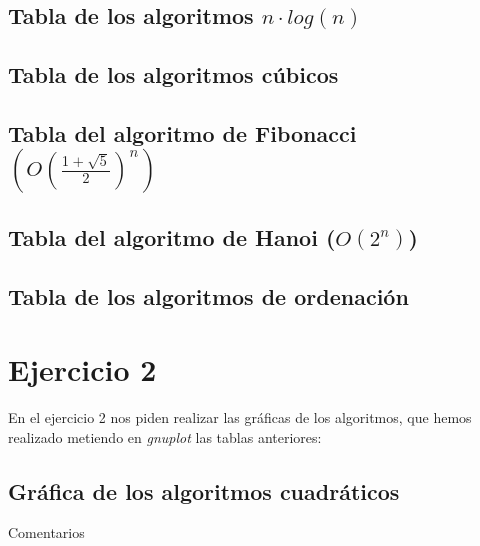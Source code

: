 \documentclass[a4paper, 11pt]{article}
\begin{document}
\subsection{Tabla de los algoritmos $n\cdot log(n)$ }


\subsection{Tabla de los algoritmos cúbicos}



\subsection{Tabla del algoritmo de Fibonacci $(O(\frac{1+\sqrt{5}}{2})^n)$}



\subsection{Tabla del algoritmo de Hanoi ($O(2^n)$)}


\subsection{Tabla de los algoritmos de ordenación}




\newpage
\section{Ejercicio 2}

En el ejercicio 2 nos piden realizar las gráficas de los algoritmos, que hemos realizado metiendo en \textit{gnuplot} las tablas anteriores:

\subsection{Gráfica de los algoritmos cuadráticos}
Comentarios
\end{document}
